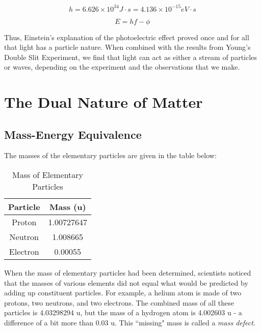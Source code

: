 	\begin{mdframed}[backgroundcolor=green!20!white]
	\begin{equation*}
		h = 6.626 \times 10^{34} \si{J \cdot s} = 4.136 \times 10^{-15} \si{eV \cdot s}
		\label{equation:planck}
	\end{equation*}
\end{mdframed}	



	\begin{mdframed}[backgroundcolor=orange!20!white]
	\begin{equation}
		E = h f - \phi
		\label{eqn:Photoelectric}
	\end{equation}
\end{mdframed}


Thus, Einstein's explanation of the photoelectric effect proved once and for all that light has a particle nature.  When combined with the results from Young's Double Slit Experiment, we find that light can act as either a stream of particles or waves, depending on the experiment and the observations that we make.  


\section{The Dual Nature of Matter} 
\subsection{Mass-Energy Equivalence} 
The masses of the elementary particles are given in the table below:

\begin{table}[h]
	\caption{Mass of Elementary Particles}

\begin{center}
	\begin{tabular}{|c|c|}
		\hline
		\textbf{Particle} & \textbf{Mass} (u) \\
		\hline
		Proton & 1.00727647 \\
		\hline
		Neutron & 1.008665 \\
		\hline
		Electron & 0.00055 \\
		\hline
		
	\end{tabular}
\end{center}
\end{table}

When the mass of elementary particles had been determined, scientists noticed that the masses of various elements did not equal what would be predicted by adding up constituent particles.  For example, a helium atom is made of two protons, two neutrons, and two electrons.  The combined mass of all these particles is 4.03298294 u, but the mass of a hydrogen atom is 4.002603 u - a difference of a bit more than 0.03 u.  This ``missing" mass is called a \textit{mass defect}.  

